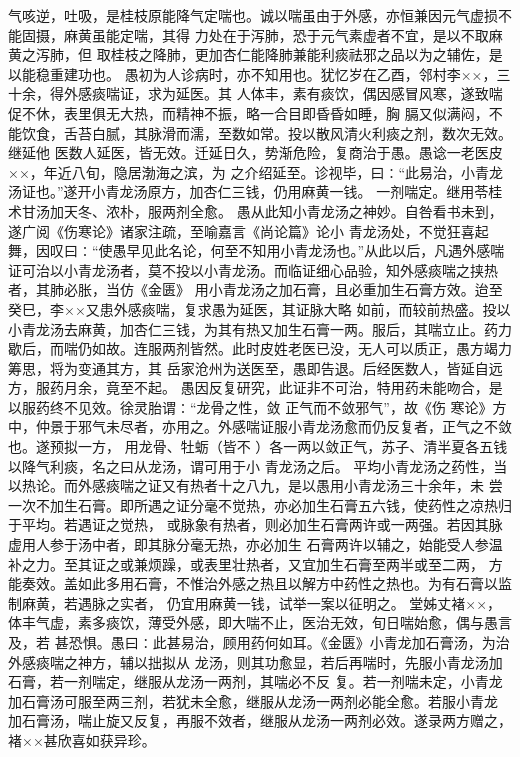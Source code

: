 \documentclass[a4paper,12pt,UTF8,twoside]{ctexbook}
\begin{document}
气咳逆，吐吸，是桂枝原能降气定喘也。诚以喘虽由于外感，亦恒兼因元气虚损不能固摄，麻黄虽能定喘，其得 
力处在于泻肺，恐于元气素虚者不宜，是以不取麻黄之泻肺，但 
取桂枝之降肺，更加杏仁能降肺兼能利痰祛邪之品以为之辅佐，是以能稳重建功也。 
愚初为人诊病时，亦不知用也。犹忆岁在乙酉，邻村李××，三十余，得外感痰喘证，求为延医。其 
人体丰，素有痰饮，偶因感冒风寒，遂致喘促不休，表里俱无大热，而精神不振，略一合目即昏昏如睡，胸 
膈又似满闷，不能饮食，舌苔白腻，其脉滑而濡，至数如常。投以散风清火利痰之剂，数次无效。继延他 
医数人延医，皆无效。迁延日久，势渐危险，复商治于愚。愚谂一老医皮××，年近八旬，隐居渤海之滨，为 
之介绍延至。诊视毕，曰∶“此易治，小青龙汤证也。”遂开小青龙汤原方，加杏仁三钱，仍用麻黄一钱。 
一剂喘定。继用苓桂术甘汤加天冬、浓朴，服两剂全愈。 
愚从此知小青龙汤之神妙。自咎看书未到，遂广阅《伤寒论》诸家注疏，至喻嘉言《尚论篇》论小 
青龙汤处，不觉狂喜起舞，因叹曰∶“使愚早见此名论，何至不知用小青龙汤也。”从此以后，凡遇外感喘 
证可治以小青龙汤者，莫不投以小青龙汤。而临证细心品验，知外感痰喘之挟热者，其肺必胀，当仿《金匮》 
用小青龙汤之加石膏，且必重加生石膏方效。迨至癸巳，李××又患外感痰喘，复求愚为延医，其证脉大略 
如前，而较前热盛。投以小青龙汤去麻黄，加杏仁三钱，为其有热又加生石膏一两。服后，其喘立止。药力 
歇后，而喘仍如故。连服两剂皆然。此时皮姓老医已没，无人可以质正，愚方竭力筹思，将为变通其方，其 
岳家沧州为送医至，愚即告退。后经医数人，皆延自远方，服药月余，竟至不起。 
愚因反复研究，此证非不可治，特用药未能吻合，是以服药终不见效。徐灵胎谓∶“龙骨之性，敛 
正气而不敛邪气”，故《伤 
寒论》方中，仲景于邪气未尽者，亦用之。外感喘证服小青龙汤愈而仍反复者，正气之不敛也。遂预拟一方， 
用龙骨、牡蛎（皆不 ）各一两以敛正气，苏子、清半夏各五钱以降气利痰，名之曰从龙汤，谓可用于小 
青龙汤之后。 
平均小青龙汤之药性，当以热论。而外感痰喘之证又有热者十之八九，是以愚用小青龙汤三十余年，未 
尝一次不加生石膏。即所遇之证分毫不觉热，亦必加生石膏五六钱，使药性之凉热归于平均。若遇证之觉热， 
或脉象有热者，则必加生石膏两许或一两强。若因其脉虚用人参于汤中者，即其脉分毫无热，亦必加生 
石膏两许以辅之，始能受人参温补之力。至其证之或兼烦躁，或表里壮热者，又宜加生石膏至两半或至二两， 
方能奏效。盖如此多用石膏，不惟治外感之热且以解方中药性之热也。为有石膏以监制麻黄，若遇脉之实者， 
仍宜用麻黄一钱，试举一案以征明之。 
堂姊丈褚××，体丰气虚，素多痰饮，薄受外感，即大喘不止，医治无效，旬日喘始愈，偶与愚言及，若 
甚恐惧。愚曰∶此甚易治，顾用药何如耳。《金匮》小青龙加石膏汤，为治外感痰喘之神方，辅以拙拟从 
龙汤，则其功愈显，若后再喘时，先服小青龙汤加石膏，若一剂喘定，继服从龙汤一两剂，其喘必不反 
复。若一剂喘未定，小青龙加石膏汤可服至两三剂，若犹未全愈，继服从龙汤一两剂必能全愈。若服小青龙 
加石膏汤，喘止旋又反复，再服不效者，继服从龙汤一两剂必效。遂录两方赠之，褚××甚欣喜如获异珍。 
\end{document}
